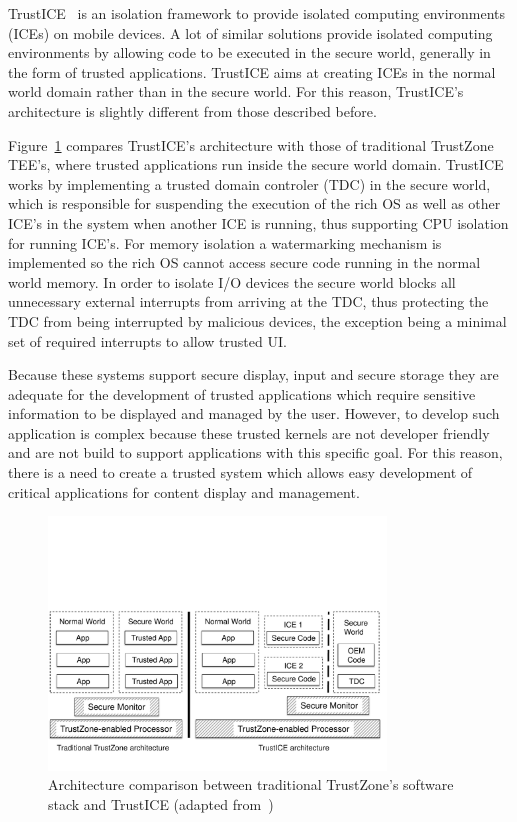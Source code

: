 TrustICE~\cite{sun2015trustice} is an isolation framework to provide isolated computing environments (ICEs) on mobile devices. A lot of similar solutions provide isolated computing environments by allowing code to be executed in the secure world, generally in the form of trusted applications. TrustICE aims at creating ICEs in the normal world domain rather than in the secure world. For this reason, TrustICE's architecture is slightly different from those described before.

Figure~\ref{fig:trustICE_architecture} compares TrustICE's architecture with those of traditional TrustZone TEE's, where trusted applications run inside the secure world domain. TrustICE works by implementing a trusted domain controler (TDC) in the secure world, which is responsible for suspending the execution of the rich OS as well as other ICE's in the system when another ICE is running, thus supporting CPU isolation for running ICE's. For memory isolation a watermarking mechanism is implemented so the rich OS cannot access secure code running in the normal world memory. In order to isolate I/O devices the secure world blocks all unnecessary external interrupts from arriving at the TDC, thus protecting the TDC from being interrupted by malicious devices, the exception being a minimal set of required interrupts to allow trusted UI.

Because these systems support secure display, input and secure storage they are adequate for the development of trusted applications which require sensitive information to be displayed and managed by the user. However, to develop such application is complex because these trusted kernels are not developer friendly and are not build to support applications with this specific goal. For this reason, there is a need to create a trusted system which allows easy development of critical applications for content display and management.

\begin{figure}[t!]
	\centering
	\includegraphics[width=0.80\textwidth]{img/trustICE.pdf}
	\caption{Architecture comparison between traditional TrustZone's software stack and TrustICE (adapted from~\cite{sun2015trustice})}
	\label{fig:trustICE_architecture}
\end{figure}

